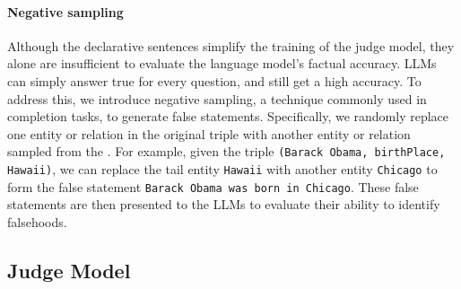 \paragraph{Negative sampling}
Although the declarative sentences simplify the training of the judge model, they alone are insufficient to evaluate the language model's factual accuracy. LLMs can simply answer true for every question, and still get a high accuracy. %
To address this, we introduce negative sampling, a technique commonly used in  completion tasks, to generate false statements. Specifically, we randomly replace one entity or relation in the original triple with another entity or relation sampled from the . For example, given the triple \texttt{(Barack Obama, birthPlace, Hawaii)}, we can replace the tail entity \texttt{Hawaii} with another entity \texttt{Chicago} to form the false statement \texttt{Barack Obama was born in Chicago}. These false statements are then presented to the LLMs to evaluate their ability to identify falsehoods.

\vspace{-2mm}
\subsection{Judge Model}\label{method:judge}


